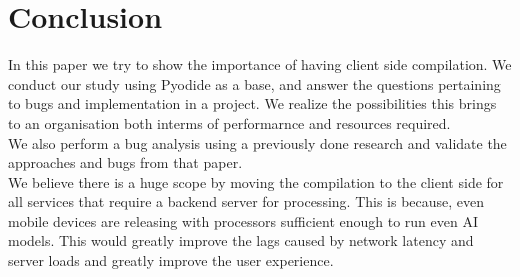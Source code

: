 \section{Conclusion}
In this paper we try to show the importance of having client side compilation. We conduct our study using Pyodide as a base, and answer the questions pertaining to bugs and implementation in a project. We realize the possibilities this brings to an organisation both interms of performarnce and resources required. \\
We also perform a bug analysis using a previously done research and validate the approaches and bugs from that paper. \\
We believe there is a huge scope by moving the compilation to the client side for all services that require a backend server for processing. This is because, even mobile devices are releasing with processors sufficient enough to run even AI models. This would greatly improve the lags caused by network latency and server loads and greatly improve the user experience. \\
